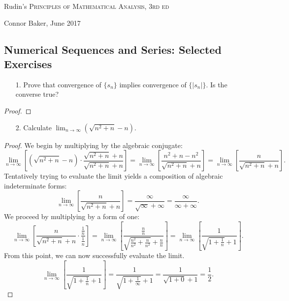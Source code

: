\documentclass[10pt]{article}
\theoremstyle{definition}
\theoremstyle{plain}
\begin{document}

\begin{center}
  {\Large Rudin's \textsc{Principles of Mathematical Analysis, 3rd ed}}

  {\large Connor Baker, June 2017}

  \subsection*{Numerical Sequences and Series: Selected Exercises}
\end{center}

\begin{enumerate}
\item[1.] Prove that convergence of $\{s_n\}$ implies convergence of $\{|s_n|\}$. Is the converse true?
\end{enumerate}

\begin{proof}

\end{proof}



\pagebreak



\begin{enumerate}
\item[2.] Calculate $\lim_{n\rightarrow\infty} (\sqrt{n^2+n}-n)$.
\end{enumerate}

\begin{proof}
We begin by multiplying by the algebraic conjugate:
$$\lim_{n\rightarrow\infty} \left[(\sqrt{n^2+n}-n) \cdot \frac{\sqrt{n^2+n}+n}{\sqrt{n^2+n}+n}\right]=\lim_{n\rightarrow\infty} \left[ \frac{n^2+n-n^2}{\sqrt{n^2+n}+n}\right] = \lim_{n\rightarrow\infty} \left[ \frac{n}{\sqrt{n^2+n}+n}\right].$$
Tentatively trying to evaluate the limit yields a composition of algebraic indeterminate forms:
$$\lim_{n\rightarrow\infty} \left[\frac{n}{\sqrt{n^2+n}+n}\right] = \frac{\infty}{\sqrt{\infty}+\infty} = \frac{\infty}{\infty+\infty}.$$
We proceed by multiplying by a form of one:
$$\lim_{n\rightarrow\infty} \left[\frac{n}{\sqrt{n^2+n}+n} \cdot \frac{\frac{1}{n}}{\frac{1}{n}}\right] = \lim_{n\rightarrow\infty}  \left[\frac{\frac{n}{n}}{\sqrt{\frac{n^2}{n^2}+\frac{n}{n^2}}+\frac{n}{n}}\right]=\lim_{n\rightarrow\infty}  \left[\frac{1}{\sqrt{1+\frac{1}{n}}+1}\right].$$
From this point, we can now successfully evaluate the limit.
$$\lim_{n\rightarrow\infty}  \left[\frac{1}{\sqrt{1+\frac{1}{n}}+1}\right] = \frac{1}{\sqrt{1+\frac{1}{\infty}}+1} = \frac{1}{\sqrt{1+0}+1} = \frac{1}{2}.$$
\end{proof}
\end{document}
